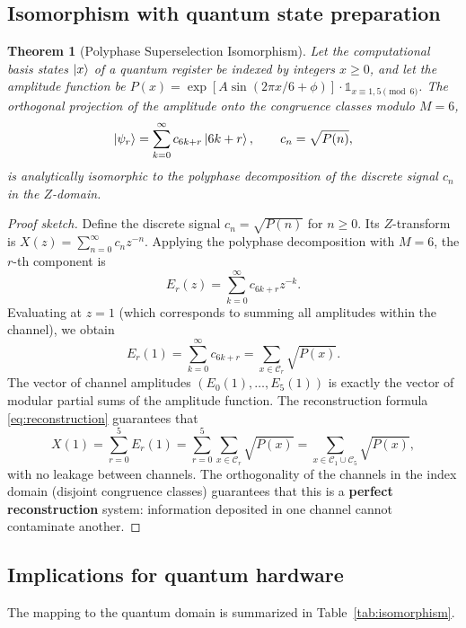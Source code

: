 \documentclass[12pt,a4paper]{article}
\theoremstyle{plain}
\newtheorem{theorem}{Theorem}[section]
\theoremstyle{definition}
\theoremstyle{remark}
\begin{document}
\subsection{Isomorphism with quantum state preparation}
\begin{theorem}[Polyphase Superselection Isomorphism]
\label{thm:polyphase}
Let the computational basis states \(\ket{x}\) of a quantum register be indexed by integers \(x \geq 0\), and let the amplitude function be \(P(x) = \exp[A\sin(2\pi x/6 + \phi)] \cdot \mathds{1}_{x \equiv 1,5 \pmod{6}}\). The orthogonal projection of the amplitude onto the congruence classes modulo \(M=6\),
\begin{equation}
\ket{\psi_r} = \sum_{k=0}^{\infty} c_{6k+r} \ket{6k+r}, \qquad c_{n} = \sqrt{P(n)},
\label{eq:modes}
\end{equation}
is analytically isomorphic to the polyphase decomposition of the discrete signal \(c_n\) in the \(Z\)-domain.
\end{theorem}

\begin{proof}[Proof sketch]
Define the discrete signal \(c_n = \sqrt{P(n)}\) for \(n \geq 0\). Its \(Z\)-transform is \(X(z) = \sum_{n=0}^{\infty} c_n z^{-n}\). Applying the polyphase decomposition with \(M=6\), the \(r\)-th component is
\[
E_r(z) = \sum_{k=0}^{\infty} c_{6k+r} z^{-k}.
\]
Evaluating at \(z=1\) (which corresponds to summing all amplitudes within the channel), we obtain
\[
E_r(1) = \sum_{k=0}^{\infty} c_{6k+r} = \sum_{x \in \mathcal{C}_r} \sqrt{P(x)}.
\]
The vector of channel amplitudes \((E_0(1), \dots, E_5(1))\) is exactly the vector of modular partial sums of the amplitude function. The reconstruction formula \eqref{eq:reconstruction} guarantees that
\[
X(1) = \sum_{r=0}^{5} E_r(1) = \sum_{r=0}^{5} \sum_{x \in \mathcal{C}_r} \sqrt{P(x)} = \sum_{x \in \mathcal{C}_1 \cup \mathcal{C}_5} \sqrt{P(x)},
\]
with no leakage between channels. The orthogonality of the channels in the index domain (disjoint congruence classes) guarantees that this is a \textbf{perfect reconstruction} system: information deposited in one channel cannot contaminate another.
\end{proof}

\subsection{Implications for quantum hardware}
The mapping to the quantum domain is summarized in Table~\ref{tab:isomorphism}.
\end{document}
